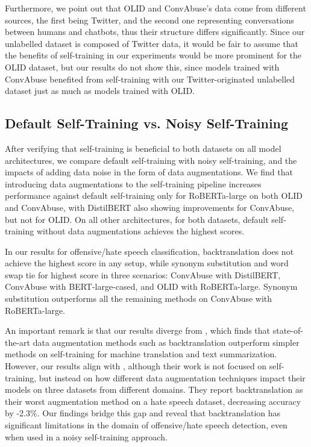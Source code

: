 \documentclass[11pt,a4paper]{article}
\begin{document}
Furthermore, we point out that OLID and ConvAbuse's data come from different sources, the first being Twitter, and the second one representing conversations between humans and chatbots, thus their structure differs significantly. Since our unlabelled dataset is composed of Twitter data, it would be fair to assume that the benefits of self-training in our experiments would be more prominent for the OLID dataset, but our results do not show this, since models trained with ConvAbuse benefited from self-training with our Twitter-originated unlabelled dataset just as much as models trained with OLID.

\subsection{Default Self-Training vs. Noisy Self-Training}
After verifying that self-training is beneficial to both datasets on all model architectures, we compare default self-training with noisy self-training, and the impacts of adding data noise in the form of data augmentations. We find that introducing data augmentations to the self-training pipeline increases performance against default self-training only for RoBERTa-large on both OLID and ConvAbuse, with DistilBERT also showing improvements for ConvAbuse, but not for OLID. On all other architectures, for both datasets, default self-training without data augmentations achieves the highest scores. 

In our results for offensive/hate speech classification, backtranslation does not achieve the highest score in any setup, while synonym substitution and word swap tie for highest score in three scenarios: ConvAbuse with DistilBERT, ConvAbuse with BERT-large-cased, and OLID with RoBERTa-large. Synonym substitution outperforms all the remaining methods on ConvAbuse with RoBERTa-large.

An important remark is that our results diverge from \citet{selftrainingseq}, which finds that state-of-the-art data augmentation methods such as backtranslation outperform simpler methods on self-training for machine translation and text summarization. However, our results align with \citet{marivate2020improving}, although their work is not focused on self-training, but instead on how different data augmentation techniques impact their models on three datasets from different domains. They report backtranslation as their worst augmentation method on a hate speech dataset, decreasing accuracy by -2.3\%. Our findings bridge this gap and reveal that backtranslation has significant limitations in the domain of offensive/hate speech detection, even when used in a noisy self-training approach.
\end{document}
